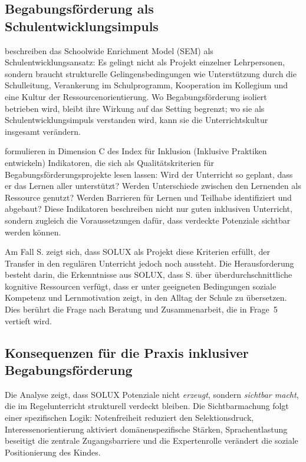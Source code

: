 \documentclass[ngerman, a4paper]{article}
\begin{document}
\subsection{Begabungsförderung als Schulentwicklungsimpuls}

\textcite[S.\,333--347]{reisrenzullimueller2021sem} beschreiben das
Schoolwide Enrichment Model (SEM) als Schulentwicklungsansatz: Es gelingt
nicht als Projekt einzelner Lehrpersonen, sondern braucht strukturelle
Gelingensbedingungen wie Unterstützung durch die Schulleitung, Verankerung
im Schulprogramm, Kooperation im Kollegium und eine Kultur der
Ressourcenorientierung. Wo Begabungsförderung isoliert betrieben wird,
bleibt ihre Wirkung auf das Setting begrenzt; wo sie als
Schulentwicklungsimpuls verstanden wird, kann sie die Unterrichtskultur
insgesamt verändern.

\textcite[Dim.\,C]{booth2019index} formulieren in Dimension C des Index für Inklusion (Inklusive
Praktiken entwickeln) Indikatoren, die sich als Qualitätskriterien für
Begabungsförderungsprojekte lesen lassen: Wird der Unterricht so geplant, dass er
das Lernen aller unterstützt? Werden Unterschiede zwischen den Lernenden als
Ressource genutzt? Werden Barrieren für Lernen und Teilhabe identifiziert und
abgebaut? Diese Indikatoren beschreiben nicht nur guten inklusiven Unterricht,
sondern zugleich die Voraussetzungen dafür, dass verdeckte Potenziale sichtbar
werden können.

Am Fall S. zeigt sich, dass SOLUX als Projekt diese Kriterien erfüllt, der Transfer
in den regulären Unterricht jedoch noch aussteht. Die Herausforderung besteht darin,
die Erkenntnisse aus SOLUX, dass S. über überdurchschnittliche kognitive Ressourcen
verfügt, dass er unter geeigneten Bedingungen soziale Kompetenz und Lernmotivation
zeigt, in den Alltag der Schule zu übersetzen. Dies berührt die Frage nach
Beratung und Zusammenarbeit, die in Frage~5 vertieft wird.

\subsection{Konsequenzen für die Praxis inklusiver Begabungsförderung}

Die Analyse zeigt, dass SOLUX Potenziale nicht \textit{erzeugt}, sondern
\textit{sichtbar macht}, die im Regelunterricht strukturell verdeckt bleiben. Die
Sichtbarmachung folgt einer spezifischen Logik: Notenfreiheit reduziert den
Selektionsdruck, Interessenorientierung aktiviert domänenspezifische Stärken,
Sprachentlastung beseitigt die zentrale Zugangsbarriere und die Expertenrolle
verändert die soziale Positionierung des Kindes.
\end{document}
